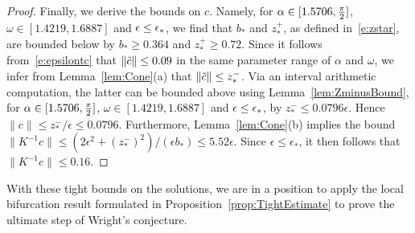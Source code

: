 \begin{proof}
Finally, we derive the bounds on $c$. Namely, for $\alpha \in  [1.5706,\tfrac{\pi}{2}]$,
$\omega \in [1.4219,1.6887]$ and $\epsilon \leq \epsilon_*$,
we find that $b_*$ and  $z_*^+$, as defined in~\eqref{e:zstar}, are bounded below by $ b_* \geq 0.364$ and 
$z^+_* \geq 0.72 $. 
Since it follows from~\eqref{e:epsilontc} that 
$ \| \tilde{c} \|  \leq 0.09 $  
in the same parameter range  of  $\alpha$ and $\omega$, we infer from Lemma~\ref{lem:Cone}(a) that 
$\| \tilde{c} \| \leq z^-_* $.
Via an interval arithmetic computation, the latter can be bounded above
using Lemma~\ref{lem:ZminusBound}, for $\alpha \in  [1.5706,\tfrac{\pi}{2}]$,
$\omega \in [1.4219,1.6887]$ and $\epsilon \leq \epsilon_*$, by
$z_*^- \leq 0.0796 \epsilon$. 
Hence 
$\| c \| \leq z_*^- / \epsilon \leq 0.0796$.
Furthermore, Lemma~\ref{lem:Cone}(b) implies 
the  bound 
$\| K^{-1} c \| \leq (2\epsilon^2 + (z_*^-)^2 )/(\epsilon b_*) \leq 5.52 \epsilon$.
Since $\epsilon \leq \epsilon_*$, it then follows that 
$\| K^{-1} c \| \leq  0.16 $.
\end{proof}

With these tight bounds on the solutions, we are in a position to apply the local bifurcation result formulated in Proposition~\ref{prop:TightEstimate} to prove the ultimate step of Wright's conjecture.

